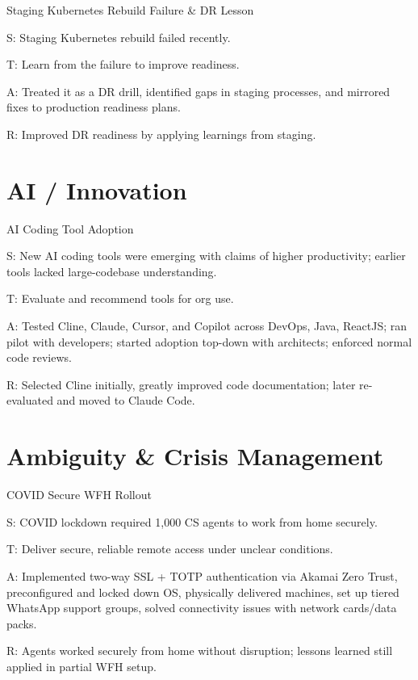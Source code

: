\documentclass[11pt]{article}
\begin{document}
\begin{starstory}{Staging Kubernetes Rebuild Failure \& DR Lesson}
\begin{starlist}
\item[S:] Staging Kubernetes rebuild failed recently.
\item[T:] Learn from the failure to improve readiness.
\item[A:] Treated it as a DR drill, identified gaps in staging processes, and mirrored fixes to production readiness plans.
\item[R:] Improved DR readiness by applying learnings from staging.
\end{starlist}
\end{starstory}

\section{AI / Innovation}

\begin{starstory}{AI Coding Tool Adoption}
\begin{starlist}
\item[S:] New AI coding tools were emerging with claims of higher productivity; earlier tools lacked large-codebase understanding.
\item[T:] Evaluate and recommend tools for org use.
\item[A:] Tested Cline, Claude, Cursor, and Copilot across DevOps, Java, ReactJS; ran pilot with developers; started adoption top-down with architects; enforced normal code reviews.
\item[R:] Selected Cline initially, greatly improved code documentation; later re-evaluated and moved to Claude Code.
\end{starlist}
\end{starstory}

\section{Ambiguity \& Crisis Management}

\begin{starstory}{COVID Secure WFH Rollout}
\begin{starlist}
\item[S:] COVID lockdown required 1,000 CS agents to work from home securely.
\item[T:] Deliver secure, reliable remote access under unclear conditions.
\item[A:] Implemented two-way SSL + TOTP authentication via Akamai Zero Trust, preconfigured and locked down OS, physically delivered machines, set up tiered WhatsApp support groups, solved connectivity issues with network cards/data packs.
\item[R:] Agents worked securely from home without disruption; lessons learned still applied in partial WFH setup.
\end{starlist}
\end{starstory}
\end{document}
